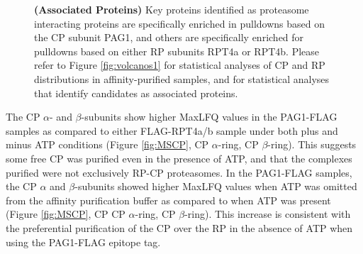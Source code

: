 \begin{figure}
	\ContinuedFloat
	{\textbf{(Associated Proteins)} Key proteins identified as proteasome interacting proteins are specifically enriched in pulldowns based on the CP subunit PAG1, and others are specifically enriched for pulldowns based on either RP subunits RPT4a or RPT4b. Please refer to Figure \ref{fig:volcanos1} for statistical analyses of CP and RP distributions in affinity-purified samples, and for statistical analyses that identify candidates as associated proteins.}
	\label{fig:MSAssociated}
\end{figure}

The CP $\alpha$- and $\beta$-subunits show higher MaxLFQ values in the PAG1-FLAG samples as compared to either FLAG-RPT4a/b sample under both plus and minus ATP conditions (Figure \ref{fig:MSCP}, CP $\alpha$-ring, CP $\beta$-ring). This suggests some free CP was purified even in the presence of ATP, and that the complexes purified were not exclusively RP-CP proteasomes. In the PAG1-FLAG samples, the CP $\alpha$ and $\beta$-subunits showed higher MaxLFQ values when ATP was omitted from the affinity purification buffer as compared to when ATP was present (Figure \ref{fig:MSCP}, CP CP $\alpha$-ring, CP $\beta$-ring). This increase is consistent with the preferential purification of the CP over the RP in the absence of ATP when using the PAG1-FLAG epitope tag.


